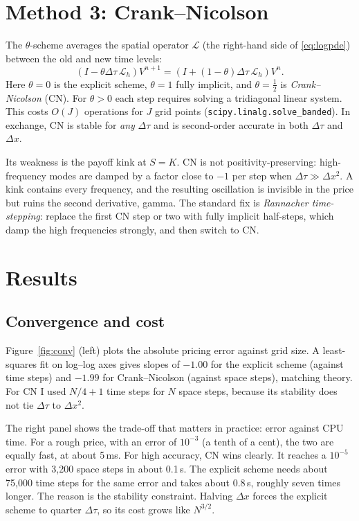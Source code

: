 \documentclass[11pt,a4paper]{article}
\newcommand{\Dt}{\Delta\tau}
\newcommand{\Dx}{\Delta x}
\begin{document}
\section{Method 3: Crank--Nicolson}

The $\theta$-scheme averages the spatial operator $\mathcal L$ (the right-hand side of
\eqref{eq:logpde}) between the old and new time levels:
\[
(I-\theta\Dt\,\mathcal L_h)V^{n+1}=(I+(1-\theta)\Dt\,\mathcal L_h)V^n .
\]
Here $\theta=0$ is the explicit scheme, $\theta=1$ fully implicit, and $\theta=\tfrac12$ is
\emph{Crank--Nicolson} (CN). For $\theta>0$ each step requires solving a tridiagonal linear
system. This costs $O(J)$ operations for $J$ grid points (\texttt{scipy.linalg.solve\_banded}).
In exchange, CN is stable for \emph{any} $\Dt$ and is second-order accurate in both $\Dt$ and
$\Dx$.

Its weakness is the payoff kink at $S=K$. CN is not positivity-preserving: high-frequency modes
are damped by a factor close to $-1$ per step when $\Dt\gg\Dx^2$. A kink contains every
frequency, and the resulting oscillation is invisible in the price but ruins the second
derivative, gamma. The standard fix is \emph{Rannacher time-stepping}: replace the first CN step
or two with fully implicit half-steps, which damp the high frequencies strongly, and then switch
to CN.

\section{Results}

\subsection{Convergence and cost}

Figure~\ref{fig:conv} (left) plots the absolute pricing error against grid size. A least-squares
fit on log--log axes gives slopes of $-1.00$ for the explicit scheme (against time steps) and
$-1.99$ for Crank--Nicolson (against space steps), matching theory. For CN I used $N/4+1$ time
steps for $N$ space steps, because its stability does not tie $\Dt$ to $\Dx^2$.

The right panel shows the trade-off that matters in practice: error against CPU time. For a rough
price, with an error of $10^{-3}$ (a tenth of a cent), the two are equally fast, at about 5\,ms.
For high accuracy, CN wins clearly. It reaches a $10^{-5}$ error with 3{,}200 space steps in
about 0.1\,s. The explicit scheme needs about 75{,}000 time steps for the same error and takes
about 0.8\,s, roughly seven times longer. The reason is the stability constraint. Halving $\Dx$
forces the explicit scheme to quarter $\Dt$, so its cost grows like $N^{3/2}$.
\end{document}
